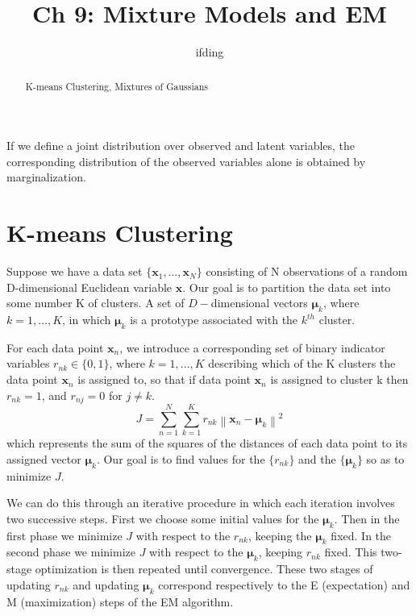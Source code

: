 \documentclass[5p,sort&compress]{elsarticle}
\begin{document}
\begin{frontmatter}
    \title{Ch 9: Mixture Models and EM}
    \author{ifding}
    
    \begin{abstract}
        K-means Clustering, Mixtures of Gaussians
    \end{abstract}


\end{frontmatter}


If we define a joint distribution over observed and latent variables, the corresponding distribution of the observed variables alone is obtained by marginalization.


\section{K-means Clustering}

Suppose we have a data set $\{\mathbf{x}_1, \ldots, \mathbf{x}_N\}$ consisting of N observations of a random D-dimensional Euclidean variable $\mathbf{x}$. Our goal is to partition the data set into some number K of clusters.  A set of $D-$dimensional vectors $\boldsymbol{\mu}_k$, where $k=1, \ldots, K$, in which $\boldsymbol{\mu}_k$ is a prototype associated with the $k^{th}$ cluster.

For each data point $\mathbf{x}_n$, we introduce a corresponding set of binary indicator variables $r_{n k} \in \{0, 1\}$, where $k=1, \ldots, K$ describing which of the K clusters the data point $\mathbf{x}_n$ is assigned to, so that if data point $\mathbf{x}_n$ is assigned to cluster k then $r_{nk} = 1$, and $r_{nj} = 0$ for $j \neq k$.
\begin{equation}
J=\sum_{n=1}^{N} \sum_{k=1}^{K} r_{n k}\left\|\mathbf{x}_{n}-\boldsymbol{\mu}_{k}\right\|^{2}
\end{equation}
which represents the sum of the squares of the distances of each data point to its assigned vector $\boldsymbol{\mu}_k$. Our goal is to find values for the $\{r_{nk}\}$ and the $\{\boldsymbol{\mu}_k\}$ so as to minimize $J$.

We can do this through an iterative procedure in which each iteration involves two successive steps. First we choose some initial values for the $\boldsymbol{\mu}_k$. Then in the first phase we minimize $J$ with respect to the $r_{nk}$, keeping the $\boldsymbol{\mu}_k$ fixed. In the second phase we minimize $J$ with respect to the $\boldsymbol{\mu}_k$, keeping $r_{nk}$ fixed. This two-stage optimization is then repeated until convergence. These two stages of updating $r_{nk}$ and updating $\boldsymbol{\mu}_k$ correspond respectively to the E (expectation) and M (maximization) steps of the EM algorithm.
\end{document}

